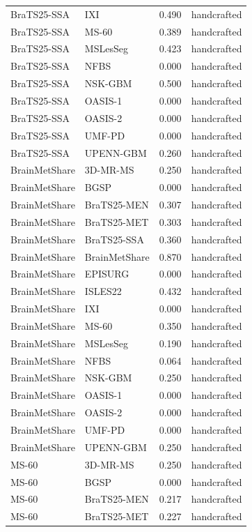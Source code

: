 \begin{tabular}{llrl}
BraTS25-SSA & IXI & 0.490 & handcrafted \\
BraTS25-SSA & MS-60 & 0.389 & handcrafted \\
BraTS25-SSA & MSLesSeg & 0.423 & handcrafted \\
BraTS25-SSA & NFBS & 0.000 & handcrafted \\
BraTS25-SSA & NSK-GBM & 0.500 & handcrafted \\
BraTS25-SSA & OASIS-1 & 0.000 & handcrafted \\
BraTS25-SSA & OASIS-2 & 0.000 & handcrafted \\
BraTS25-SSA & UMF-PD & 0.000 & handcrafted \\
BraTS25-SSA & UPENN-GBM & 0.260 & handcrafted \\
BrainMetShare & 3D-MR-MS & 0.250 & handcrafted \\
BrainMetShare & BGSP & 0.000 & handcrafted \\
BrainMetShare & BraTS25-MEN & 0.307 & handcrafted \\
BrainMetShare & BraTS25-MET & 0.303 & handcrafted \\
BrainMetShare & BraTS25-SSA & 0.360 & handcrafted \\
BrainMetShare & BrainMetShare & 0.870 & handcrafted \\
BrainMetShare & EPISURG & 0.000 & handcrafted \\
BrainMetShare & ISLES22 & 0.432 & handcrafted \\
BrainMetShare & IXI & 0.000 & handcrafted \\
BrainMetShare & MS-60 & 0.350 & handcrafted \\
BrainMetShare & MSLesSeg & 0.190 & handcrafted \\
BrainMetShare & NFBS & 0.064 & handcrafted \\
BrainMetShare & NSK-GBM & 0.250 & handcrafted \\
BrainMetShare & OASIS-1 & 0.000 & handcrafted \\
BrainMetShare & OASIS-2 & 0.000 & handcrafted \\
BrainMetShare & UMF-PD & 0.000 & handcrafted \\
BrainMetShare & UPENN-GBM & 0.250 & handcrafted \\
MS-60 & 3D-MR-MS & 0.250 & handcrafted \\
MS-60 & BGSP & 0.000 & handcrafted \\
MS-60 & BraTS25-MEN & 0.217 & handcrafted \\
MS-60 & BraTS25-MET & 0.227 & handcrafted \\

\end{tabular}
